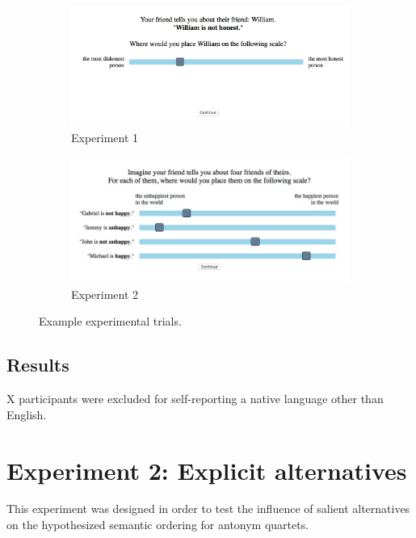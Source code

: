 \documentclass[10pt,letterpaper]{article}
\begin{document}
\begin{figure}[t]
	\centering
	\begin{subfigure}[t]{0.5\textwidth}
		\centering
		\includegraphics[width=\textwidth]{expt1.jpeg}
		\caption{Experiment 1}\label{fig:expt1}		
	\end{subfigure}%
	\quad
	\begin{subfigure}[t]{0.5\textwidth}
		\centering
		\includegraphics[width=\textwidth]{expt2.jpeg}
		\caption{Experiment 2}\label{fig:expt2}
	\end{subfigure}
	\caption{Example experimental trials.}\label{fig:expt-procedure}
\end{figure}


\subsection{Results}

X participants were excluded for self-reporting a native language other than English. 


\section{Experiment 2: Explicit alternatives}
This experiment was designed in order to test the influence of salient alternatives on the hypothesized semantic ordering for antonym quartets.
\end{document}
